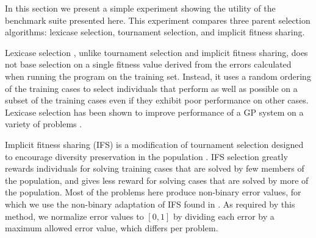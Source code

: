 \documentclass{sig-alternate}
\begin{document}
In this section we present a simple experiment showing the utility of the benchmark suite presented here. This experiment compares three parent selection algorithms: lexicase selection, tournament selection, and implicit fitness sharing.

Lexicase selection \cite{Helmuth:2014:ieeeTEC, Spector:2012:APM:2330784.2330846}, %
 unlike tournament selection and implicit fitness sharing, does not base selection on a single fitness value derived from the errors calculated when running the program on the training set. Instead, it uses a random ordering of the training cases to select individuals that perform as well as possible on a subset of the training cases even if they exhibit poor performance on other cases. Lexicase selection has been shown to improve performance of a GP system on a variety of problems \cite{Helmuth:2014:ieeeTEC, Helmuth:2014:GECCO, Helmuth:2013:GECCOcomp}. %

Implicit fitness sharing (IFS) is a modification of tournament selection designed to encourage diversity preservation in the population \cite{McKay:2000:GECCO}. IFS selection greatly rewards individuals for solving training cases that are solved by few members of the population, and gives less reward for solving cases that are solved by more of the population. Most of the problems here produce non-binary error values, for which we use the non-binary adaptation of IFS found in \cite{Krawiec:2013:EvoIASP}. As required by this method, we normalize error values to $[0, 1]$ by dividing each error by a maximum allowed error value, which differs per problem. 
\end{document}
